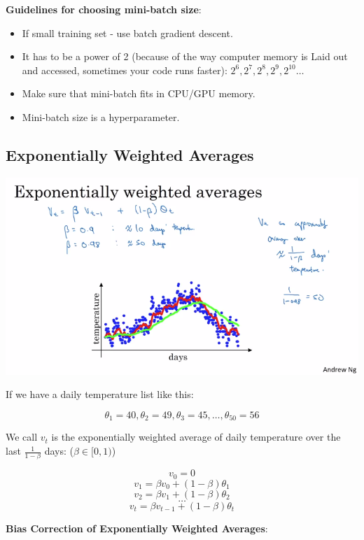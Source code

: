 \documentclass{article}
\begin{document}
\noindent \textbf{Guidelines for choosing mini-batch size}:

\begin{itemize}
  \item If small training set - use batch gradient descent.
  \item It has to be a power of 2 (because of the way computer memory is Laid out and accessed, sometimes your code runs faster): \(2^{6}, 2^{7}, 2^{8}, 2^{9}, 2^{10} \dots\)
  \item Make sure that mini-batch fits in CPU/GPU memory.
  \item Mini-batch size is a hyperparameter.
\end{itemize}

\subsection{Exponentially Weighted Averages}

\begin{center}
\includegraphics[scale=0.4]{./images/exponentially_weighted_average.png}
\end{center}

\noindent If we have a daily temperature list like this:

\[\theta_{1} = 40, \theta_{2} = 49, \theta_{3} = 45, \dots, \theta_{50} = 56\]

\noindent We call \(v_{t}\) is the exponentially weighted average of daily temperature over the last \(\frac{1}{1 - \beta}\) days: (\(\beta \in [0, 1)\))

\[v_{0} = 0\]
\[v_{1} = \beta v_{0} + (1 - \beta) \theta_{1}\]
\[v_{2} = \beta v_{1} + (1 - \beta) \theta_{2}\]
\[\dots\]
\[v_{t} = \beta v_{t - 1} + (1 - \beta) \theta_{t}\]

\noindent \textbf{Bias Correction of Exponentially Weighted Averages}:
\end{document}
